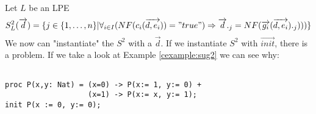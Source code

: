 \index{}\documentclass[a4paper,10pt]{article}
\theoremstyle{plain}
\theoremstyle{definition}
\newcommand{\ovr}{\overrightarrow}
\begin{document}
\begin{defn} Let $L$ be an LPE\label{def:sug2} 
\begin{displaymath}
S_L^2(\ovr{d})=
\lbrace   
j \in \lbrace 1, \ldots , n \rbrace \vert \forall_{i\in I} (NF(c_i(\ovr{d,e_i})) = "true") \Rightarrow \ovr{d}._j = NF(\ovr{g_i}(\ovr{d,e_i})._j)))\rbrace
\end{displaymath}
We now can "instantiate" the $S^2$ with a $\ovr{d}$. If we instantiate $S^2$ with $\ovr{init}$, there is a problem. If we take a look at Example \ref{cexample:sug2} we can see why:
\begin{example} [Let $E2$ be]\label{cexample:sug2}\begin{verbatim} 
 
proc P(x,y: Nat) = (x=0) -> P(x:= 1, y:= 0) +
                   (x=1) -> P(x:= x, y:= 1);
init P(x := 0, y:= 0);


\end{verbatim}
\end{example}
\end{defn}
\end{document}
